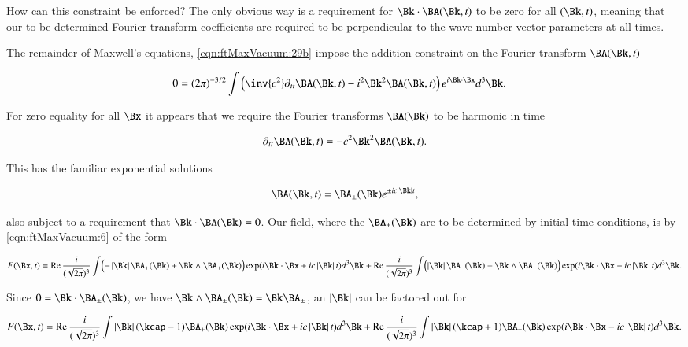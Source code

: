 How can this constraint be enforced?  The only obvious way is a requirement for $\Bk \cdot \BA(\Bk, t)$ to be zero for all $(\Bk,t)$, meaning that our to be determined Fourier transform coefficients are required to be perpendicular to the wave number vector parameters at all times.

The remainder of Maxwell's equations, \autoref{eqn:ftMaxVacuum:29b} impose the addition constraint on the Fourier transform $\BA(\Bk,t)$

\begin{align}\label{eqn:ftMaxVacuum:60}
0 &= (2 \pi)^{-3/2} \int \left( \inv{c^2} \partial_{tt} \BA(\Bk, t) - i^2 \Bk^2 \BA(\Bk, t)\right) e^{i \Bk \cdot \Bx } d^3 \Bk.
\end{align}

For zero equality for all $\Bx$ it appears that we require the Fourier transforms $\BA(\Bk)$ to be harmonic in time

\begin{align}\label{eqn:ftMaxVacuum:61}
\partial_{tt} \BA(\Bk, t) = - c^2 \Bk^2 \BA(\Bk, t).
\end{align}

This has the familiar exponential solutions

\begin{align}\label{eqn:ftMaxVacuum:62}
\BA(\Bk, t) = \BA_{\pm}(\Bk) e^{ \pm i c \Abs{\Bk} t },
\end{align}

also subject to a requirement that $\Bk \cdot \BA(\Bk) = 0$.  Our field, where the $\BA_{\pm}(\Bk)$ are to be determined by initial time conditions, is by \autoref{eqn:ftMaxVacuum:6} of the form

\begin{align}\label{eqn:ftMaxVacuum:63}
F(\Bx, t)
= 
\Real \frac{i}{(\sqrt{2\pi})^3} \int \Bigl( -\Abs{\Bk} \BA_{+}(\Bk) + \Bk \wedge \BA_{+}(\Bk) \Bigr) \exp(i \Bk \cdot \Bx + i c \Abs{\Bk} t) d^3 \Bk
+ \Real \frac{i}{(\sqrt{2\pi})^3} \int \Bigl( \Abs{\Bk} \BA_{-}(\Bk) + \Bk \wedge \BA_{-}(\Bk) \Bigr) \exp(i \Bk \cdot \Bx - i c \Abs{\Bk} t) d^3 \Bk.
\end{align}

Since $0 = \Bk \cdot \BA_{\pm}(\Bk)$, we have $\Bk \wedge \BA_{\pm}(\Bk) = \Bk \BA_{\pm}$, an $\Abs{\Bk}$ can be factored out for

\begin{align}\label{eqn:ftMaxVacuum:64}
F(\Bx, t)
= 
\Real \frac{i}{(\sqrt{2\pi})^3} \int \Abs{\Bk} ( \kcap - 1 ) \BA_{+}(\Bk) \exp(i \Bk \cdot \Bx + i c \Abs{\Bk} t) d^3 \Bk
+ \Real \frac{i}{(\sqrt{2\pi})^3} \int \Abs{\Bk} ( \kcap + 1 ) \BA_{-}(\Bk) \exp(i \Bk \cdot \Bx - i c \Abs{\Bk} t) d^3 \Bk.
\end{align}

